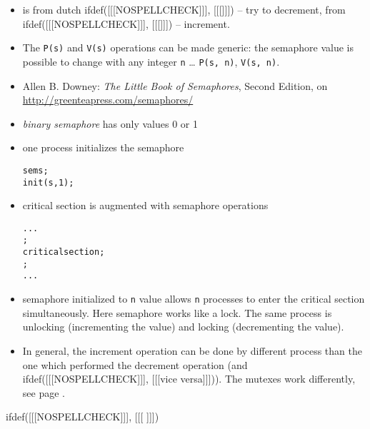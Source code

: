 \begin{itemize}
\item {} is from dutch ifdef([[[NOSPELLCHECK]]],
[[[]]]) -- try to
decrement,  from ifdef([[[NOSPELLCHECK]]], [[[]]])
-- increment.
\item The \texttt{P(s)} and \texttt{V(s)} operations can be made generic:
the semaphore value is possible to change with any integer
\texttt{n} \dots{} \texttt{P(s,~n)}, \texttt{V(s,~n)}.
\item Allen B. Downey: \emph{The Little Book of Semaphores}, Second Edition,
on \url{http://greenteapress.com/semaphores/}
\item \emph{binary semaphore} has only values 0 or 1
\end{itemize}


\begin{slide}
\begin{itemize}
\item one process initializes the semaphore
\begin{alltt}
sem s;
init(s, 1);
\end{alltt}
\item critical section is augmented with semaphore operations
\begin{alltt}
...
;
critical section;
;
...
\end{alltt}
\end{itemize}
\end{slide}


\begin{itemize}
\item semaphore initialized to \texttt{n} value allows \texttt{n} processes
to enter the critical section simultaneously. Here semaphore works like a lock.
The same process is unlocking (incrementing the value) and locking
(decrementing the value).
\item In general, the increment operation can be done by different process
than the one which performed the decrement operation (and
ifdef([[[NOSPELLCHECK]]], [[[vice versa]]])).
The mutexes work differently, see page \pageref{MUTEXES}.
\end{itemize}


ifdef([[[NOSPELLCHECK]]], [[[
]]])

